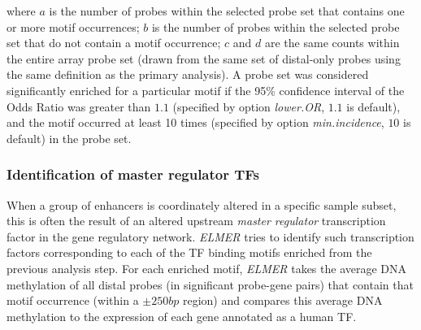 where $a$ is the number of probes within the selected probe set that contains one 
or more motif occurrences; $b$ is the number of probes within the selected probe 
set that do not contain a motif occurrence; $c$ and $d$ are the same counts within 
the entire array probe set (drawn from the same set of distal-only probes using the same definition as the primary analysis). A probe set was considered significantly enriched 
for a particular motif if the 95\% confidence interval of the Odds Ratio was 
greater than $1.1$ (specified by option \textit{lower.OR}, $1.1$ is default), and the motif 
occurred at least 10 times (specified by option \textit{min.incidence}, $10$ is default) in 
the probe set. 


\subsubsection*{Identification of master regulator TFs}

When a group of enhancers is coordinately altered in a specific sample subset, this is often the result of an altered upstream \textit{master regulator} transcription factor in the gene regulatory network. \textit{ELMER} tries to identify such transcription factors corresponding to each of the TF binding motifs enriched from the previous analysis step.
For each enriched motif, \textit{ELMER} takes the average DNA methylation of all distal probes (in significant probe-gene pairs) that contain that motif occurrence (within a $\pm 250bp$ region) and compares this average DNA methylation to the expression of each gene annotated as a human TF.

